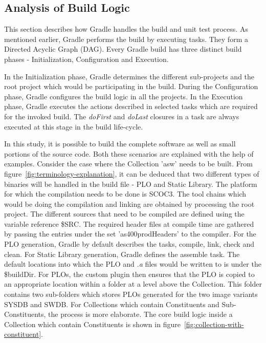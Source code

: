 \documentclass[12pt, a4paper, titlepage]{scrartcl}
\begin{document}
\subsection{Analysis of Build Logic}
\par This section describes how Gradle handles the build and unit test process. As mentioned earlier, Gradle performs the build by executing tasks. They form a Directed Acyclic Graph (DAG)\cite{thulasiraman2011graphs}. Every Gradle build has three distinct build phases - Initialization, Configuration and Execution. 
\par In the Initialization phase, Gradle determines the different sub-projects and the root project which would be participating in the build. During the Configuration phase, Gradle configures the build logic in all the projects. In the Execution phase, Gradle executes the actions described in selected tasks which are required for the invoked build. The \emph{doFirst} and \emph{doLast} closures in a task are always executed at this stage in the build life-cycle. 
\par In this study, it is possible to build the complete software as well as small portions of the source code. Both these scenarios are explained with the help of examples. Consider the case where the Collection 'asw' needs to be built. From figure~\ref{fig:terminology-explanation}, it can be deduced that two different types of binaries will be handled in the build file - PLO and Static Library. The platform for which the compilation needs to be done is SCOC3. The tool chains which would be doing the compilation and linking are obtained by processing the root project. The different sources that need to be compiled are defined using the variable reference \$SRC. The required header files at compile time are gathered by passing the entries under the set 'as400prodHeaders' to the compiler. For the PLO generation, Gradle by default describes the tasks, compile, link, check and clean. For Static Library generation, Gradle defines the assemble task. The default locations into which the PLO and \emph{.a} files would be written to is under the \$buildDir. For PLOs, the custom plugin then ensures that the PLO is copied to an appropriate location within a folder at a level above the Collection. This folder contains two sub-folders which stores PLOs generated for the two image variants SYSDB and SWDB. For Collections which contain Constituents and Sub-Constituents, the process is more elaborate. The core build logic inside a Collection which contain Constituents is shown in figure~\ref{fig:collection-with-constituent}. 
\end{document}

